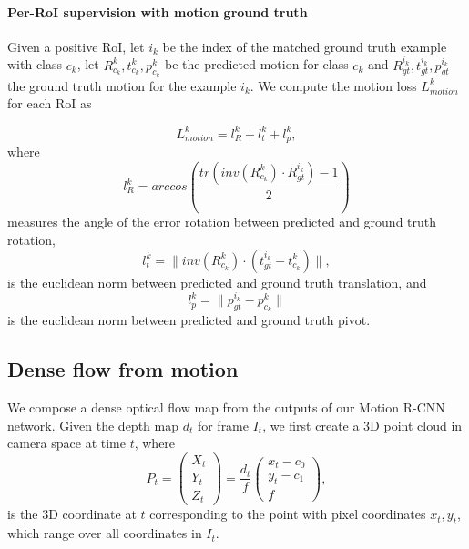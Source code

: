\paragraph{Per-RoI supervision with motion ground truth}
Given a positive RoI, let $i_k$ be the index of the matched ground truth example with class $c_k$,
let $R_{c_k}^k, t_{c_k}^k, p_{c_k}^k$ be the predicted motion for class $c_k$
and $R_{gt}^{i_k}, t_{gt}^{i_k}, p_{gt}^{i_k}$ the ground truth motion for the example $i_k$.
We compute the motion loss $L_{motion}^k$ for each RoI as

\begin{equation}
L_{motion}^k =l_{R}^k + l_{t}^k + l_{p}^k,
\end{equation}
where
\begin{equation}
l_{R}^k = arccos\left(\frac{tr(inv(R_{c_k}^k) \cdot R_{gt}^{i_k}) - 1}{2} \right)
\end{equation}
measures the angle of the error rotation between predicted and ground truth rotation,
\begin{equation}
l_{t}^k = \lVert inv(R_{c_k}^k) \cdot (t_{gt}^{i_k} - t_{c_k}^k) \rVert,
\end{equation}
is the euclidean norm between predicted and ground truth translation, and
\begin{equation}
l_{p}^k = \lVert p_{gt}^{i_k} - p_{c_k}^k \rVert
\end{equation}
is the euclidean norm between predicted and ground truth pivot.


\subsection{Dense flow from motion}
We compose a dense optical flow map from the outputs of our Motion R-CNN network.
Given the depth map $d_t$ for frame $I_t$, we first create a 3D point cloud in camera space at time $t$,
where
\begin{equation}
P_t =
\begin{pmatrix}
X_t \\ Y_t \\ Z_t
\end{pmatrix}
=
\frac{d_t}{f}
\begin{pmatrix}
x_t - c_0 \\ y_t - c_1 \\ f
\end{pmatrix},
\end{equation}
is the 3D coordinate at $t$ corresponding to the point with pixel coordinates $x_t, y_t$,
which range over all coordinates in $I_t$.

